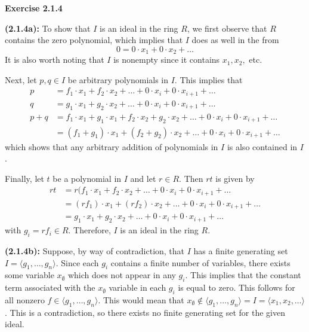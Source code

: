 \documentclass[12pt,oneside]{article}
\newenvironment{exercise}[1]{\vspace{.1in}\noindent\textbf{Exercise #1 \hspace{.05em}}}{}
\begin{document}
\begin{exercise}{2.1.4}

    \bigskip
    \textbf{(2.1.4a):}
    To show that $I$ is an ideal in the ring $R$, we first observe that 
    $R$ contains the zero polynomial, which implies that $I$ does as well 
    in the from
    \[
        0 = 0 \cdot x_1 + 0 \cdot x_2 + \ldots
    \]
    It is also worth noting that $I$ is nonempty since it contains $x_1, x_2,$ etc.

    Next, let $p,q \in I$ be arbitrary polynomials in $I$. This implies that
    \begin{align*}
        p   &= f_1 \cdot x_1 + f_2 \cdot x_2 + \ldots + 0 \cdot x_i + 0 \cdot x_{i+1} + \ldots\\
        q   &= g_1 \cdot x_1 + g_2 \cdot x_2 + \ldots + 0 \cdot x_i + 0 \cdot x_{i+1} + \ldots\\
        p+q &= f_1 \cdot x_1 + g_1 \cdot x_1 + f_2 \cdot x_2 + g_2 \cdot x_2 + \ldots + 0 \cdot x_i + 0 \cdot x_{i+1} + \ldots\\
            &= (f_1 + g_1) \cdot x_1 + (f_2 + g_2) \cdot x_2 + \ldots + 0 \cdot x_i + 0 \cdot x_{i+1} + \ldots
    \end{align*}
    which shows that any arbitrary addition of polynomials in $I$ is also 
    contained in $I$.

    Finally, let $t$ be a polynomial in $I$ and let $r \in R$. Then 
    $rt$ is given by 
    \begin{align*}
        rt  &= r(f_1 \cdot x_1 + f_2 \cdot x_2 + \ldots + 0 \cdot x_i + 0 \cdot x_{i+1} + \ldots\\
            &= (rf_1) \cdot x_1 + (rf_2) \cdot x_2 + \ldots + 0 \cdot x_i + 0 \cdot x_{i+1} + \ldots\\
            &= g_1 \cdot x_1 + g_2 \cdot x_2 + \ldots + 0 \cdot x_i + 0 \cdot x_{i+1} + \ldots
    \end{align*}
    with $g_i = rf_i \in R$. Therefore, $I$ is an ideal in the ring $R$.

    \bigskip
    \textbf{(2.1.4b):}
    Suppose, by way of contradiction, that $I$ has a finite generating set 
    $I = \langle g_1,\ldots,g_n \rangle$. Since each $g_i$ contains a finite 
    number of variables, there exists some variable $x_\emptyset$ which does 
    not appear in any $g_i$. This implies that the constant term associated with
    the $x_\emptyset$ variable in each $g_i$ is equal to zero. This follows for 
    all nonzero $f \in \langle g_1, \ldots, g_n \rangle$. This would mean that 
    $x_\emptyset \not \in \langle g_1, \ldots, g_n \rangle = I = \langle x_1, x_2, \ldots \rangle$.
    This is a contradiction, so there exists no finite generating set for the 
    given ideal.

\end{exercise}
\end{document}
